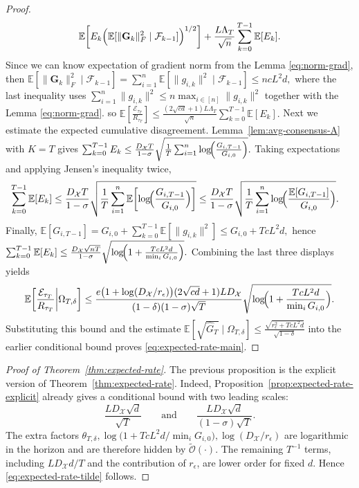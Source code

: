\documentclass[runningheads]{llncs}
\begin{document}
\begin{proof}
\begin{align*}
\mathbb E\!\left[E_k\Bigl(\mathbb E[\|\mathbf G_k\|_F^2\mid \mathcal F_{k-1}]\Bigr)^{1/2}\right]
+
\frac{L\Lambda_T}{\sqrt n}\sum_{k=0}^{T-1}\mathbb E[E_k].
\end{align*}
Since we can know expectation of  gradient norm from the Lemma \ref{eq:norm-grad}, then 
\(
\mathbb E[\|\mathbf G_k\|_F^2\mid \mathcal F_{k-1}]
=
\sum_{i=1}^n \mathbb E[\|g_{i,k}\|^2\mid \mathcal F_{k-1}]
\le
ncL^2d,
\)
where the last inequality uses
\(\sum_{i=1}^n \|g_{i,k}\|^2\le n\max_{i\in[n]}\|g_{i,k}\|^2\) together with the Lemma \ref{eq:norm-grad}.
so
\(
\mathbb E\!\left[\frac{\mathcal E_{\tau_T}}{R_{\tau_T}}\right]
\le
\frac{(2\sqrt{cd}+1)L\Lambda_T}{\sqrt n}\sum_{k=0}^{T-1}\mathbb E[E_k].
\)
Next we estimate the expected cumulative disagreement. Lemma~\ref{lem:avg-consensus-A}
with \(K=T\) gives
\(
\sum_{k=0}^{T-1}E_k
\le
\frac{D_{\mathcal{X}}T}{1-\sigma}
\sqrt{\frac{1}{T}\sum_{i=1}^{n}\log\!\Bigl(\frac{G_{i,T-1}}{G_{i,0}}\Bigr)}.
\)
Taking expectations and applying Jensen's inequality twice,
\begin{align*}
\sum_{k=0}^{T-1}\mathbb E[E_k]
&\le
\frac{D_{\mathcal{X}}T}{1-\sigma}
\sqrt{\frac{1}{T}\sum_{i=1}^{n}
\mathbb E\!\left[\log\!\Bigl(\frac{G_{i,T-1}}{G_{i,0}}\Bigr)\right]} \le
\frac{D_{\mathcal{X}}T}{1-\sigma}
\sqrt{\frac{1}{T}\sum_{i=1}^{n}
\log\!\Bigl(\frac{\mathbb E[G_{i,T-1}]}{G_{i,0}}\Bigr)}.
\end{align*}
Finally,
\(
\mathbb E[G_{i,T-1}]
=
G_{i,0}+\sum_{k=0}^{T-1}\mathbb E[\|g_{i,k}\|^2]
\le
G_{i,0}+TcL^2d,
\)
hence
\(
\sum_{k=0}^{T-1}\mathbb E[E_k]
\le
\frac{D_{\mathcal{X}}\sqrt{nT}}{1-\sigma}
\sqrt{\log\!\Bigl(1+\frac{TcL^2d}{\min_i G_{i,0}}\Bigr)}.
\)
Combining the last three displays yields
\[
\mathbb E\!\left[\frac{\mathcal E_{\tau_T}}{R_{\tau_T}}\middle|\Omega_{T,\delta}\right]
\le
\frac{e\bigl(1+\log(D_{\mathcal{X}}/r_\epsilon)\bigr)(2\sqrt{cd}+1)L D_{\mathcal{X}}}
{(1-\delta)(1-\sigma)\sqrt T}
\sqrt{\log\!\Bigl(1+\frac{TcL^2d}{\min_i G_{i,0}}\Bigr)}.
\]
Substituting this bound and the estimate
\(
\mathbb E[\sqrt{\hat G_T}\mid \Omega_{T,\delta}]
\le
\frac{\sqrt{r_\epsilon^2+TcL^2d}}{\sqrt{1-\delta}}
\)
into the earlier conditional bound proves \eqref{eq:expected-rate-main}.
\end{proof}

\begin{proof}[Proof of Theorem~\ref{thm:expected-rate}]
The previous proposition is the explicit version of Theorem~\ref{thm:expected-rate}.
Indeed, Proposition~\ref{prop:expected-rate-explicit} already gives a conditional
bound with two leading scales:
\[
\frac{L D_{\mathcal{X}}\sqrt d}{\sqrt T}
\qquad\text{and}\qquad
\frac{L D_{\mathcal{X}}\sqrt d}{(1-\sigma)\sqrt T}.
\]
The extra factors
\(
\theta_{T,\delta},
\log\!\bigl(1+TcL^2d/\min_i G_{i,0}\bigr),
\log(D_{\mathcal{X}}/r_\epsilon)
\)
are logarithmic in the horizon and are therefore hidden by
\(\widetilde{\mathcal O}(\cdot)\). The remaining \(T^{-1}\) terms, including
\(L D_{\mathcal{X}}d/T\) and the contribution of \(r_\epsilon\), are lower
order for fixed \(d\). Hence \eqref{eq:expected-rate-tilde} follows.
\end{proof}
\end{document}
